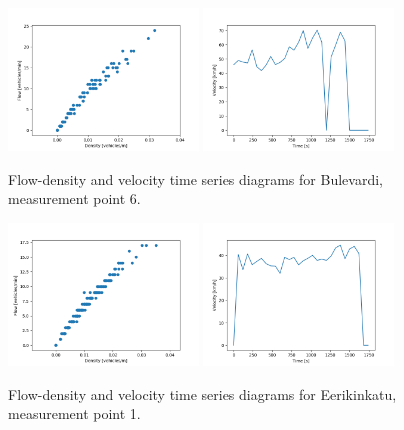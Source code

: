 \documentclass[english, 12pt, a4paper, elec, utf8, pdfa, online]{aaltothesis}
\begin{document}
\clearpage
\begin{figure}[ht!]
    \centering
    \includegraphics[width=0.45\textwidth]{graphs/Bulevardi_6_flw_dns.png}
    \includegraphics[width=0.45\textwidth]{graphs/Bulevardi_6_spd_time_6.png}
    \caption{Flow-density and velocity time series diagrams for Bulevardi, measurement point 6.}
\end{figure}
\begin{figure}[ht!]
    \centering
    \includegraphics[width=0.45\textwidth]{graphs/Eerikinkatu_1_flw_dns.png}
    \includegraphics[width=0.45\textwidth]{graphs/Eerikinkatu_1_spd_time_6.png}
    \caption{Flow-density and velocity time series diagrams for Eerikinkatu, measurement point 1.}
\end{figure}
\end{document}
